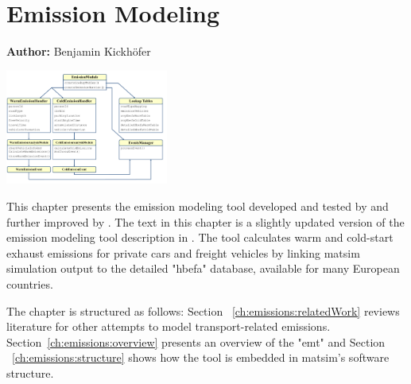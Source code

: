 \chapter{Emission Modeling}
\label{ch:emissions}

\hfill \textbf{Author:} Benjamin Kickhöfer

\begin{center} \includegraphics[width=0.4\textwidth, angle=0]{extending/figures/emissionToolOverview_pdfa.pdf} \end{center}


{\citet{HuelsmannEtAl_LAS_2011,KickhoeferEtAl_VanoutriveVerhetsel_2013,KickhoeferNagel2011MappingEmissions,KickhoeferNagel2012EmissionInternalization,HuelsmannEtAl_GerikeEtAl_2013,Kickhoefer_PhDThesis_2014,KickhoeferKern_MobilTUM_2014}}

This chapter presents the emission modeling tool developed and tested by \citet{HuelsmannEtAl_LAS_2011} and further improved by \citet{KickhoeferEtAl_VanoutriveVerhetsel_2013}. The text in this chapter is a slightly updated version of the emission modeling tool description in \citet{Kickhoefer_PhDThesis_2014}.
%
The tool calculates warm and cold-start exhaust emissions for private cars and freight vehicles by linking \gls{matsim} simulation output to the detailed "\gls{hbefa}"  database, available for many European countries.

The chapter is structured as follows:
%
Section ~\ref{ch:emissions:relatedWork} reviews literature for other attempts to model transport-related emissions. Section~\ref{ch:emissions:overview} presents an overview of the "\gls{emt}" and Section ~\ref{ch:emissions:structure} shows how the tool is embedded in \gls{matsim}'s software structure.

